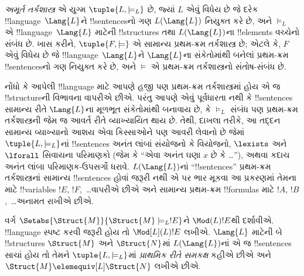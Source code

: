\documentclass[../../../include/open-logic-section]{subfiles}
\begin{document}

\begin{defn}
  \emph{અમૂર્ત તર્કશાસ્ત્ર} એ યુગ્મ $\tuple{L, \models_L}$ છે, જ્યાં
  $L$ એવું વિધેય છે જે દરેક !!{language}~$\Lang{L}$ને
  !!{sentence}sનો ગણ $L(\Lang{L})$ નિયુક્ત કરે છે, અને $\models_L$ એ
  !!{language}~$\Lang{L}$ માટેની !!{structure}s તથા $L(\Lang{L})$ના
  !!{element}s વચ્ચેનો સંબંધ છે. ખાસ કરીને, $\tuple{F, \models}$ એ
  સામાન્ય પ્રથમ-ક્રમ તર્કશાસ્ત્ર છે; એટલે કે, $F$ એવું વિધેય છે જે
  !!{language}~$\Lang{L}$ને $\Lang{L}$ના સંકેતોમાંથી બનેલાં પ્રથમ-ક્રમ
  !!{sentence}sનો ગણ નિયુક્ત કરે છે, અને $\models$ એ પ્રથમ-ક્રમ
  તર્કશાસ્ત્રનો સંતોષ-સંબંધ છે.
\end{defn}

નોંધો કે આપેલી !!{language} માટે આપણે હજી પણ પ્રથમ-ક્રમ તર્કશાસ્ત્રમાં
હોય એ જ !!{structure}ની વિભાવના વાપરીએ છીએ. પરંતુ આપણે એવું પૂર્વધારતા
નથી કે !!{sentence}s સામાન્ય રીતે $\Lang{L}$ના મૂળભૂત સંકેતોમાંથી
બનાવાય છે, કે $\models_L$ સંબંધ પણ પ્રથમ-ક્રમ તર્કશાસ્ત્રની જેમ જ
આવર્ત રીતે વ્યાખ્યાયિત થાય છે. તેથી, દાખલા તરીકે, આ તદ્દન સામાન્ય
વ્યાખ્યાનો આશય એવા કિસ્સાઓને પણ આવરી લેવાનો છે જેમાં
$\tuple{L,\models_L}$નાં !!{sentence}s અનંત લાંબાં સંયોજનો કે વિયોજનો,
$\lexists$ અને $\lforall$ સિવાયના પરિમાણકો (જેમ કે ``એવા અનંત ઘણા
$x$ છે કે \dots''), અથવા કદાચ અનંત લાંબા પરિમાણક-ઉપસર્ગો ધરાવે.
$L(\Lang{L})$નાં ``!!{sentence}s'' પ્રથમ-ક્રમ તર્કશાસ્ત્રનાં સામાન્ય
!!{sentence}s હોવાં જરૂરી નથી એ પર ભાર મૂકવા આ પ્રકરણમાં તેમના માટે
!!{variable}s $!E$, $!F$,~\dots વાપરીએ છીએ અને સામાન્ય પ્રથમ-ક્રમ
!!{formula}s માટે $!A$, $!B$,~\dots અનામત રાખીએ છીએ.

\begin{defn}
  વર્ગ $\Setabs{\Struct{M}}{\Struct{M} \models_L !E}$ને
  $\Mod(L){!E}$થી દર્શાવીએ. !!{language} સ્પષ્ટ કરવી જરૂરી હોય તો
  $\Mod[L](L){!E}$ લખીએ. $\Lang{L}$ માટેની બે !!{structure}s
  $\Struct{M}$ અને $\Struct{N}$માં $L(\Lang{L})$નાં એ જ
  !!{sentence}s સાચાં હોય તો તેમને $\tuple{L, \models_L}$માં
  \emph{પ્રાથમિક રીતે સમકક્ષ} કહીએ છીએ અને $\Struct{M}
  \elemequiv[L] \Struct{N}$ લખીએ છીએ.
\end{defn}
\end{document}
